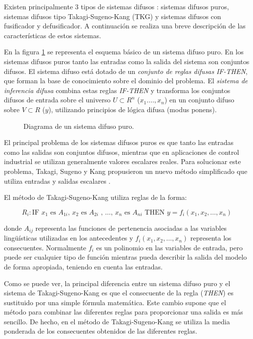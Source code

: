 Existen principalmente 3 tipos de sistemas difusos \cite{wang1997}: sistemas difusos puros, sistemas difusos tipo Takagi-Sugeno-Kang (TKG) y sistemas difusos con fusificador y defusificador. A continuación se realiza una breve descripción de las características de estos sistemas.

En la figura \ref{fig:pure-fuzzy-system} se representa el esquema básico de un sistema difuso puro. En los sistemas difusos puros tanto las entradas como la salida del sistema son conjuntos difusos. El sistema difuso está dotado de un \emph{conjunto de reglas difusas} \emph{IF-THEN}, que forman la base de conocimiento sobre el dominio del problema. El \emph{sistema de inferencia difusa} combina estas reglas \emph{IF-THEN} y transforma los conjuntos difusos de entrada sobre el universo $U \subset R^{n}$ ($x_{1}.\ldots,x_{n}$) en un conjunto difuso sobre $V \subset R$ ($y$), utilizando principios de lógica difusa (modus ponens).

\begin{figure}[tb]
	\centering
	
	\caption{Diagrama de un sistema difuso puro.}
	\label{fig:pure-fuzzy-system}
\end{figure}

El principal problema de los sistemas difusos puros es que tanto las entradas como las salidas son conjuntos difusos, mientras que en aplicaciones de control industrial se utilizan generalmente valores escalares reales. Para solucionar este problema, Takagi, Sugeno y Kang propusieron un nuevo método simplificado que utiliza entradas y salidas escalares \cite{takagisugeno1985}\cite{sugenokang1988}.

El método de Takagi-Sugeno-Kang utiliza reglas de la forma:

\begin{equation}
R_{i}: \text{IF }x_{1}\text{ es }A_{1i}\text{, }x_{2}\text{ es }A_{2i}\text{ , \ldots , }x_{n}\text{ es }A_{ni}\text{ THEN } y = f_{i}(x_{1},x_{2},\ldots,x_{n})
\end{equation}

donde $A_{ij}$ representa las funciones de pertenencia asociadas a las variables lingüísticas utilizadas en los antecedentes y $f_{i}(x_{1},x_{2},\ldots,x_{n})$ representa los consecuentes. Normalmente $f_{i}$ es un polinomio en las variables de entrada, pero puede ser cualquier tipo de función mientras pueda describir la salida del modelo de forma apropiada, teniendo en cuenta las entradas. 

Como se puede ver, la principal diferencia entre un sistema difuso puro y el sistema de Takagi-Sugeno-Kang es que el consecuente de la regla (\emph{THEN}) es sustituido por una simple fórmula matemática. Este cambio supone que el método para combinar las diferentes reglas para proporcionar una salida es más sencillo. De hecho, en el método de Takagi-Sugeno-Kang se utiliza la media ponderada de los consecuentes obtenidos de las diferentes reglas.

